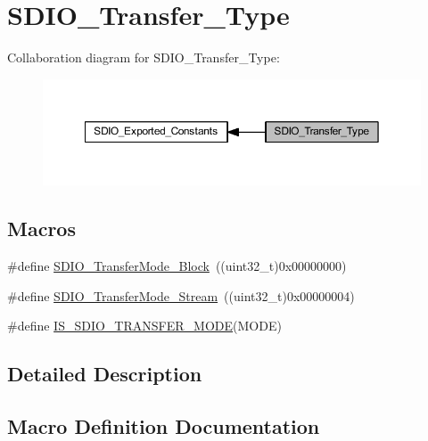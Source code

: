 \hypertarget{group___s_d_i_o___transfer___type}{}\section{S\+D\+I\+O\+\_\+\+Transfer\+\_\+\+Type}
\label{group___s_d_i_o___transfer___type}
Collaboration diagram for S\+D\+I\+O\+\_\+\+Transfer\+\_\+\+Type\+:
\nopagebreak
\begin{figure}[H]
\begin{center}
\leavevmode
\includegraphics[width=350pt]{group___s_d_i_o___transfer___type}
\end{center}
\end{figure}
\subsection*{Macros}
\begin{DoxyCompactItemize}
\item 
\#define \hyperlink{group___s_d_i_o___transfer___type_ga5b54ada18cc4072ceff1d98ee4b69972}{S\+D\+I\+O\+\_\+\+Transfer\+Mode\+\_\+\+Block}~((uint32\+\_\+t)0x00000000)
\item 
\#define \hyperlink{group___s_d_i_o___transfer___type_gadd0cafe0a80e6b6cc5c22d838cbb2e28}{S\+D\+I\+O\+\_\+\+Transfer\+Mode\+\_\+\+Stream}~((uint32\+\_\+t)0x00000004)
\item 
\#define \hyperlink{group___s_d_i_o___transfer___type_gaf7565ea93f9ed01558bdc9ad80dac763}{I\+S\+\_\+\+S\+D\+I\+O\+\_\+\+T\+R\+A\+N\+S\+F\+E\+R\+\_\+\+M\+O\+DE}(M\+O\+DE)
\end{DoxyCompactItemize}


\subsection{Detailed Description}


\subsection{Macro Definition Documentation}
\mbox{\label{group___s_d_i_o___transfer___type_gaf7565ea93f9ed01558bdc9ad80dac763}} 
